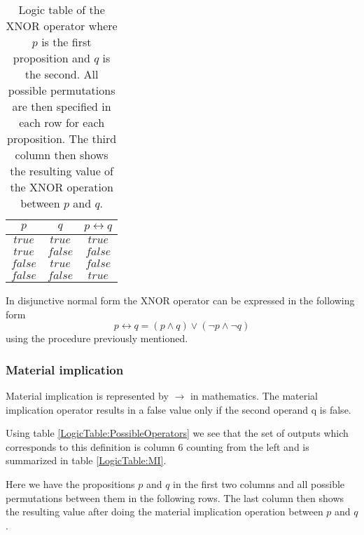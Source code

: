                \begin{table}[h!]
                   \centering
                   \begin{tabular}{|c|c|c|}
                   	\hline
                   	  $p$   &   $q$   & $p \leftrightarrow q$ \\ \hline
                   	$true$  & $true$  &        $true$         \\ \hline
                   	$true$  & $false$ &        $false$        \\ \hline
                   	$false$ & $true$  &        $false$        \\ \hline
                   	$false$ & $false$ &        $true$         \\ \hline
                   \end{tabular}
                   \caption{Logic table of the XNOR operator where $p$ is the first proposition and $q$ is the second. All possible permutations are then specified in each row for each proposition. The third column then shows the resulting value of the XNOR operation between $p$ and $q$.}
                   \label{LogicTable:XNOR}
               \end{table}
           
                In disjunctive normal form the XNOR operator can be expressed in the following form
                \begin{equation}
                p \leftrightarrow q = (p \wedge  q) \vee (\neg p \wedge \neg q)
                \end{equation}
                using the procedure previously mentioned.
                
            \subsubsection{Material implication}
                Material implication is represented by $\rightarrow$ in mathematics. The material implication operator results in a false value only if the second operand q is false.
                
                Using table \ref{LogicTable:PossibleOperators} we see that the set of outputs which corresponds to this definition is column 6 counting from the left and is summarized in table \ref{LogicTable:MI}.
                
                Here we have the propositions $p$ and $q$ in the first two columns and all possible permutations between them in the following rows. The last column then shows the resulting value after doing the material implication operation between $p$ and $q$.
                
